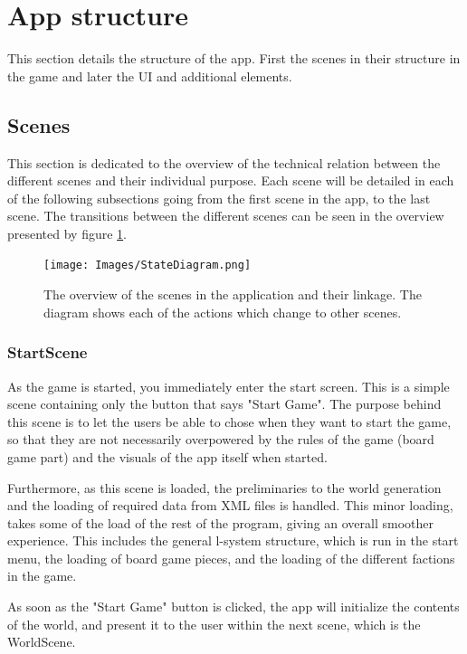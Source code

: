 \section{App structure}
This section details the structure of the app. First the scenes in their structure in the game and later the UI and additional elements.

\subsection{Scenes}
This section is dedicated to the overview of the technical relation between the different scenes and their individual purpose. Each scene will be detailed in each of the following subsections going from the first scene in the app, to the last scene.
The transitions between the different scenes can be seen in the overview presented by figure \ref{fig:appState}.

\begin{figure}[h]
    \centering
    \texttt{[image: Images/StateDiagram.png]}
    \caption{The overview of the scenes in the application and their linkage. The diagram shows each of the actions which change to other scenes.}
    \label{fig:appState}
\end{figure}

\subsubsection{StartScene}
As the game is started, you immediately enter the start screen. This is a simple scene containing only the button that says "Start Game". The purpose behind this scene is to let the users be able to chose when they want to start the game, so that they are not necessarily overpowered by the rules of the game (board game part) and the visuals of the app itself when started.

Furthermore, as this scene is loaded, the preliminaries to the world generation and the loading of required data from XML files is handled. This minor loading, takes some of the load of the rest of the program, giving an overall smoother experience.
This includes the general l-system structure, which is run in the start menu, the loading of board game pieces, and the loading of the different factions in the game.

As soon as the "Start Game" button is clicked, the app will initialize the contents of the world, and present it to the user within the next scene, which is the WorldScene.

